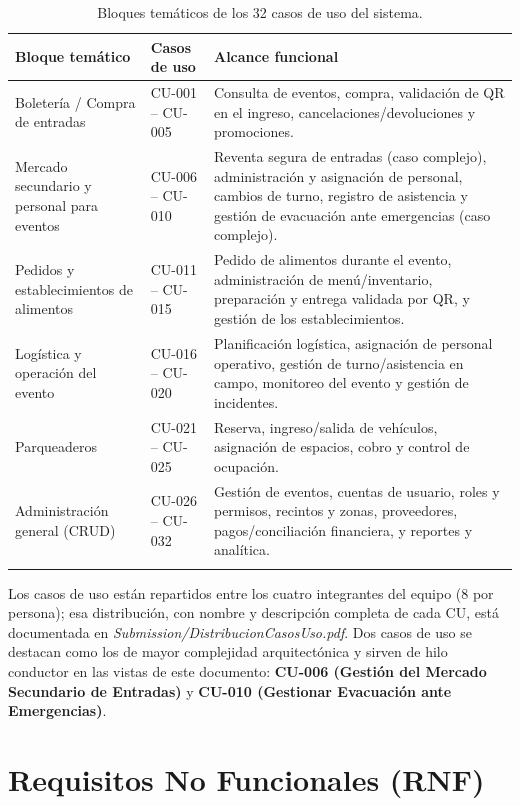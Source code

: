 \documentclass[11pt,a4paper]{article}
\begin{document}
\begin{center}
\begin{longtable}{p{3.4cm}p{2.6cm}p{8.5cm}}
\toprule
\textbf{Bloque temático} & \textbf{Casos de uso} & \textbf{Alcance funcional}\\
\midrule
\endhead
Boletería / Compra de entradas & CU-001 -- CU-005 & Consulta de eventos, compra, validación de QR
en el ingreso, cancelaciones/devoluciones y promociones.\\[0.3em]
Mercado secundario y personal para eventos & CU-006 -- CU-010 & Reventa segura de entradas
(caso complejo), administración y asignación de personal, cambios de turno, registro de
asistencia y gestión de evacuación ante emergencias (caso complejo).\\[0.3em]
Pedidos y establecimientos de alimentos & CU-011 -- CU-015 & Pedido de alimentos durante el
evento, administración de menú/inventario, preparación y entrega validada por QR, y gestión de
los establecimientos.\\[0.3em]
Logística y operación del evento & CU-016 -- CU-020 & Planificación logística, asignación de
personal operativo, gestión de turno/asistencia en campo, monitoreo del evento y gestión de
incidentes.\\[0.3em]
Parqueaderos & CU-021 -- CU-025 & Reserva, ingreso/salida de vehículos, asignación de espacios,
cobro y control de ocupación.\\[0.3em]
Administración general (CRUD) & CU-026 -- CU-032 & Gestión de eventos, cuentas de usuario, roles
y permisos, recintos y zonas, proveedores, pagos/conciliación financiera, y reportes y
analítica.\\
\bottomrule
\caption{Bloques temáticos de los 32 casos de uso del sistema.}
\label{tab:cu-bloques}
\end{longtable}
\end{center}

Los casos de uso están repartidos entre los cuatro integrantes del equipo (8 por persona); esa
distribución, con nombre y descripción completa de cada CU, está documentada en
\textit{Submission/DistribucionCasosUso.pdf}. Dos casos de uso se destacan como los de mayor
complejidad arquitectónica y sirven de hilo conductor en las vistas de este documento:
\textbf{CU-006 (Gestión del Mercado Secundario de Entradas)} y \textbf{CU-010 (Gestionar
Evacuación ante Emergencias)}.

\section{Requisitos No Funcionales (RNF)}
\label{sec:rnf}
\end{document}
